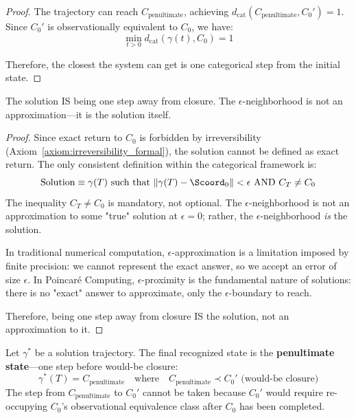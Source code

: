 \begin{proof}
The trajectory can reach $C_{\text{penultimate}}$, achieving $d_{\text{cat}}(C_{\text{penultimate}}, C_0') = 1$. Since $C_0'$ is observationally equivalent to $C_0$, we have:
\begin{equation}
\min_{t > 0} d_{\text{cat}}(\gamma(t), C_0) = 1
\end{equation}

Therefore, the closest the system can get is one categorical step from the initial state.
\end{proof}

\begin{corollary}
\label{cor:epsilon_boundary}
The solution IS being one step away from closure. The $\epsilon$-neighborhood is not an approximation---it is the solution itself.
\end{corollary}

\begin{proof}
Since exact return to $C_0$ is forbidden by irreversibility (Axiom~\ref{axiom:irreversibility_formal}), the solution cannot be defined as exact return. The only consistent definition within the categorical framework is:
\begin{equation}
\text{Solution} \equiv \gamma(T) \text{ such that } \|\gamma(T) - \Scoord_0\| < \epsilon \text{ AND } C_T \neq C_0
\end{equation}
The inequality $C_T \neq C_0$ is mandatory, not optional. The $\epsilon$-neighborhood is not an approximation to some "true" solution at $\epsilon = 0$; rather, the $\epsilon$-neighborhood \textit{is} the solution.

In traditional numerical computation, $\epsilon$-approximation is a limitation imposed by finite precision: we cannot represent the exact answer, so we accept an error of size $\epsilon$. In Poincaré Computing, $\epsilon$-proximity is the fundamental nature of solutions: there is no "exact" answer to approximate, only the $\epsilon$-boundary to reach.

Therefore, being one step away from closure IS the solution, not an approximation to it.
\end{proof}

\begin{theorem}
\label{thm:penultimate}
Let $\gamma^*$ be a solution trajectory. The final recognized state is the \textbf{penultimate state}---one step before would-be closure:
\begin{equation}
\gamma^*(T) = C_{\text{penultimate}} \quad \text{where} \quad C_{\text{penultimate}} \prec C_0' \text{ (would-be closure)}
\end{equation}
The step from $C_{\text{penultimate}}$ to $C_0'$ cannot be taken because $C_0'$ would require re-occupying $C_0$'s observational equivalence class after $C_0$ has been completed.
\end{theorem}


